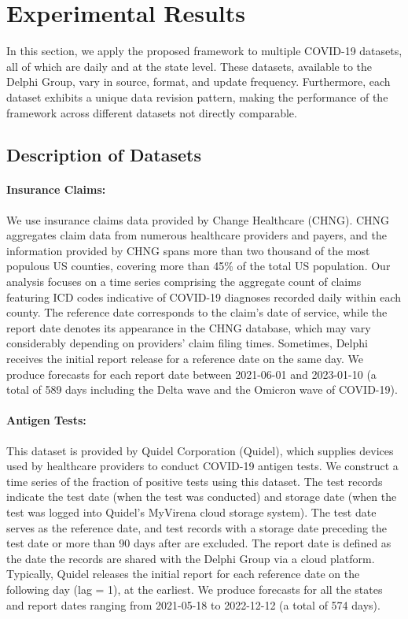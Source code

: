 \section{Experimental Results}
In this section, we apply the proposed framework to multiple COVID-19 datasets, all of which are daily and at the state level. These datasets, available to the Delphi Group, vary in source, format, and update frequency. Furthermore, each dataset exhibits a unique data revision pattern, making the performance of the framework across different datasets not directly comparable.

\subsection{Description of Datasets}
\paragraph{Insurance Claims:} We use insurance claims data provided by Change Healthcare (CHNG). CHNG aggregates claim data from numerous healthcare providers and payers, and the information provided by CHNG spans more than two thousand of the most populous US counties, covering more than 45\% of the total US population. Our analysis focuses on a time series comprising the aggregate count of claims featuring ICD codes indicative of COVID-19 diagnoses recorded daily within each county. The reference date corresponds to the claim's date of service, while the report date denotes its appearance in the CHNG database, which may vary considerably depending on providers' claim filing times. Sometimes, Delphi receives the initial report release for a reference date on the same day. We produce forecasts for each report date between 2021-06-01 and 2023-01-10 (a total of 589 days including the Delta wave and the Omicron wave of COVID-19). 

\paragraph{Antigen Tests:}
This dataset is provided by Quidel Corporation (Quidel), which supplies devices used by healthcare providers to conduct COVID-19 antigen tests. We construct a time series of the fraction of positive tests using this dataset. The test records indicate the test date (when the test was conducted) and storage date (when the test was logged into Quidel's MyVirena cloud storage system). The test date serves as the reference date, and test records with a storage date preceding the test date or more than 90 days after are excluded. The report date is defined as the date the records are shared with the Delphi Group via a cloud platform. Typically, Quidel releases the initial report for each reference date on the following day (lag = 1), at the earliest. We produce forecasts for all the states and report dates ranging from 2021-05-18 to 2022-12-12 (a total of 574 days). 

